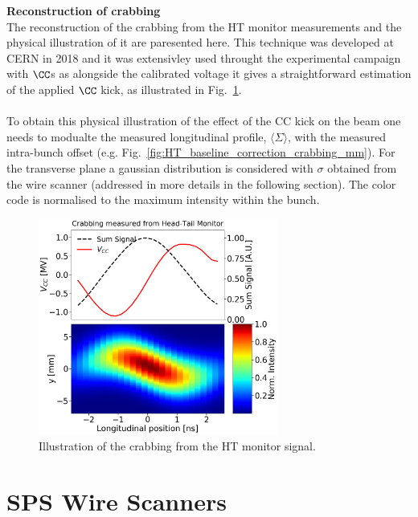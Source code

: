 \normalsize{\textbf{Reconstruction of crabbing}}\\
The reconstruction of the crabbing from the HT monitor measurements and the physical illustration of it are paresented here. This technique was developed at CERN in 2018 and it was extensivley used throught the experimental campaign with $\CC$s as alongside the calibrated voltage it gives a straightforward estimation of the applied $\CC$ kick, as illustrated in Fig.~\ref{fig:crabbing_reconstruction_HT_monitor}. \\ \\
To obtain this physical illustration of the effect of the CC kick on the beam one needs to modualte the measured longitudinal profile, $\langle \Sigma \rangle$, with the measured intra-bunch offset (e.g. Fig.~\ref{fig:HT_baseline_correction_crabbing_mm}). For the transverse plane a gaussian distribution is considered with $\sigma$ obtained from the wire scanner (addressed in more details in the following section). The color code is normalised to the maximum intensity within the bunch.

\begin{figure}[!h]
   \centering         
   \includegraphics[width=0.7\textwidth]{images/Ch4/HT_crabVoltage__20180530_135105_crabbing_only.png}
       \caption{Illustration of the crabbing from the HT monitor signal.}
       \label{fig:crabbing_reconstruction_HT_monitor}
\end{figure}
   



\section{SPS Wire Scanners}

